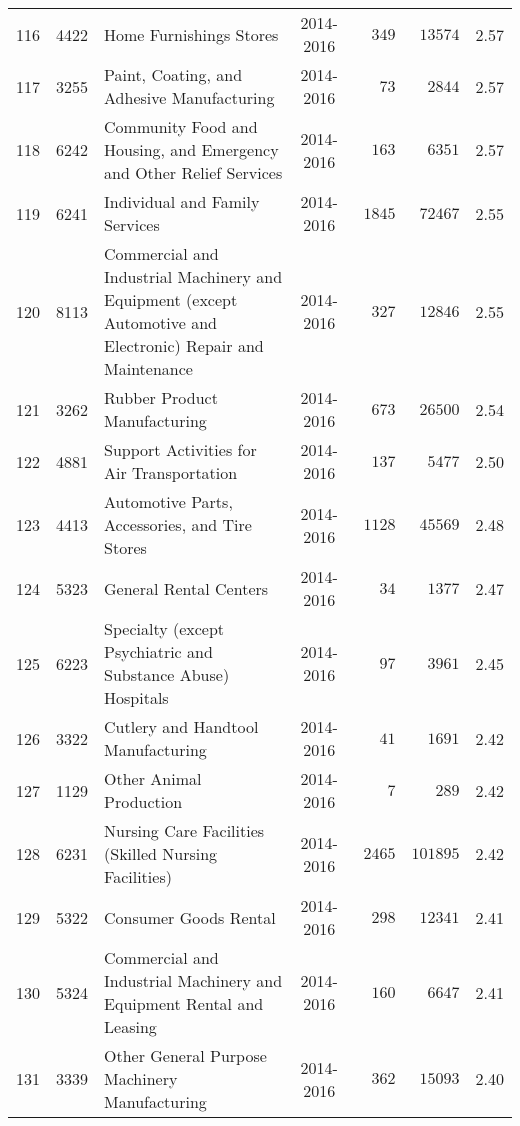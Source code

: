 \documentclass[9pt, oneside]{article}   	%
\begin{document}
\begin{longtable}{lcp{3in}cccc}
116  & 4422 & Home Furnishings Stores & 2014-2016 & $\phantom{00}349$ & $\phantom{0}13574$ &  2.57 \\
117  & 3255 & Paint, Coating, and Adhesive Manufacturing & 2014-2016 & $\phantom{000}73$ & $\phantom{00}2844$ &  2.57 \\
118  & 6242 & Community Food and Housing, and Emergency and Other Relief Services & 2014-2016 & $\phantom{00}163$ & $\phantom{00}6351$ &  2.57 \\
119  & 6241 & Individual and Family Services & 2014-2016 & $\phantom{0}1845$ & $\phantom{0}72467$ &  2.55 \\
120  & 8113 & Commercial and Industrial Machinery and Equipment (except Automotive and Electronic) Repair and Maintenance & 2014-2016 & $\phantom{00}327$ & $\phantom{0}12846$ &  2.55 \\
121  & 3262 & Rubber Product Manufacturing & 2014-2016 & $\phantom{00}673$ & $\phantom{0}26500$ &  2.54 \\
122  & 4881 & Support Activities for Air Transportation & 2014-2016 & $\phantom{00}137$ & $\phantom{00}5477$ &  2.50 \\
123  & 4413 & Automotive Parts, Accessories, and Tire Stores & 2014-2016 & $\phantom{0}1128$ & $\phantom{0}45569$ &  2.48 \\
124  & 5323 & General Rental Centers & 2014-2016 & $\phantom{000}34$ & $\phantom{00}1377$ &  2.47 \\
125  & 6223 & Specialty (except Psychiatric and Substance Abuse) Hospitals & 2014-2016 & $\phantom{000}97$ & $\phantom{00}3961$ &  2.45 \\
126  & 3322 & Cutlery and Handtool Manufacturing & 2014-2016 & $\phantom{000}41$ & $\phantom{00}1691$ &  2.42 \\
127  & 1129 & Other Animal Production & 2014-2016 & $\phantom{0000}7$ & $\phantom{000}289$ &  2.42 \\
128  & 6231 & Nursing Care Facilities (Skilled Nursing Facilities) & 2014-2016 & $\phantom{0}2465$ & $101895$ &  2.42 \\
129  & 5322 & Consumer Goods Rental & 2014-2016 & $\phantom{00}298$ & $\phantom{0}12341$ &  2.41 \\
130  & 5324 & Commercial and Industrial Machinery and Equipment Rental and Leasing & 2014-2016 & $\phantom{00}160$ & $\phantom{00}6647$ &  2.41 \\
131  & 3339 & Other General Purpose Machinery Manufacturing & 2014-2016 & $\phantom{00}362$ & $\phantom{0}15093$ &  2.40 \\

\end{longtable}
\end{document}
